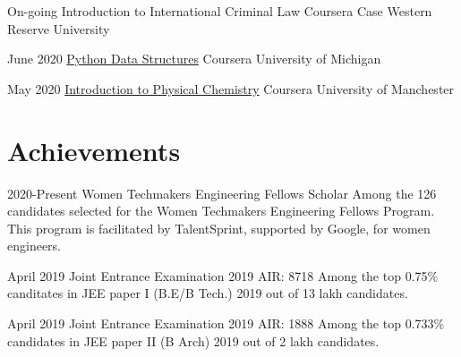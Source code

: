 \documentclass[a4paper]{fortysecondscv}
\begin{document}
\begin{cvtable}
	\cvitem
		{On-going}
		{Introduction to International Criminal Law}
		{Coursera}
		{Case Western Reserve University}

	\cvitem
		{June 2020}
		{\href{https://www.coursera.org/account/accomplishments/certificate/ZCBH4JE34ES4}{Python Data Structures}}
		{Coursera}
		{University of Michigan}

	\cvitem
		{May 2020}
		{\href{https://www.coursera.org/account/accomplishments/certificate/FYVZ79HDRVE4}{Introduction to Physical Chemistry}}
		{Coursera}
		{University of Manchester}
\end{cvtable}

\section{Achievements}
\begin{cvtable}
  \cvitem
  	{2020-Present}
    {Women Techmakers Engineering Fellows Scholar}
    {}
    {Among the 126 candidates selected for the Women Techmakers Engineering Fellows Program. This program is facilitated by TalentSprint, supported by Google, for women engineers.\\}
    
  \cvitem
  	{April 2019}
  	{Joint Entrance Examination 2019}
  	{AIR: 8718}
  	{Among the top 0.75\% canditates in JEE paper I (B.E/B Tech.) 2019 out of 13 lakh candidates.\\}

  \cvitem
  	{April 2019}
  	{Joint Entrance Examination 2019}
  	{AIR: 1888}
  	{Among the top 0.733\% candidates in JEE paper II (B Arch) 2019 out of 2 lakh candidates.\\}
\end{cvtable}
\end{document}
